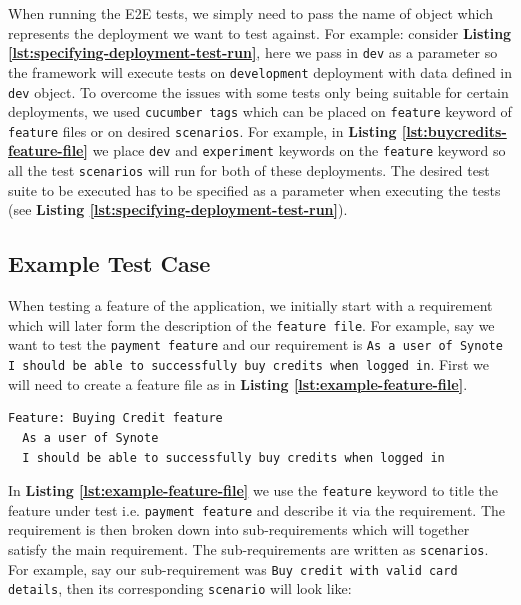 When running the E2E tests, we simply need to pass the name of object which represents the deployment we want to test against. For example: consider \textbf{Listing \ref{lst:specifying-deployment-test-run}}, here we pass in \texttt{dev} as a parameter so the framework will execute tests on \texttt{development} deployment with data defined in \texttt{dev} object.  To overcome the issues with some tests only being suitable for certain deployments, we used \texttt{cucumber tags} which can be placed on \texttt{feature} keyword of \texttt{feature} files or on desired \texttt{scenarios}. For example, in \textbf{Listing \ref{lst:buycredits-feature-file}} we place \texttt{dev} and \texttt{experiment} keywords on the \texttt{feature} keyword so all the test \texttt{scenarios} will run for both of these deployments. The desired test suite to be executed has to be specified as a parameter when executing the tests (see \textbf{Listing \ref{lst:specifying-deployment-test-run}}).

\subsection{Example Test Case}
\label{subsec:example-test-case}

When testing a feature of the application, we initially start with a requirement which will later form the description of the \texttt{feature file}. For example, say we want to test the \texttt{payment feature} and our requirement is \texttt{As a user of Synote I should be able to successfully buy credits when logged in}. First we will need to create a feature file as in \textbf{Listing \ref{lst:example-feature-file}}.

\begin{listing}[H]
\begin{verbatim}
Feature: Buying Credit feature
  As a user of Synote
  I should be able to successfully buy credits when logged in
\end{verbatim}
\label{lst:example-feature-file}
\end{listing}

In \textbf{Listing \ref{lst:example-feature-file}} we use the \texttt{feature} keyword to title the feature under test i.e. \texttt{payment feature} and describe it via the requirement. The requirement is then broken down into sub-requirements which will together satisfy the main requirement. The sub-requirements are written as \texttt{scenarios}. For example, say our sub-requirement was \texttt{Buy credit with valid card details}, then its corresponding \texttt{scenario} will look like:

